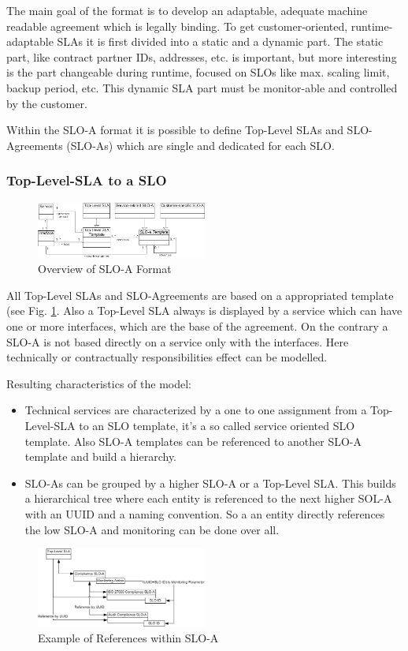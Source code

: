 The main goal of the format is to develop an adaptable, adequate machine readable agreement which is legally binding. To get customer-oriented, runtime-adaptable SLAs it is first divided into a static and a dynamic part. The static part, like contract partner IDs, addresses, etc. is important, but more interesting is the part changeable during runtime, focused on SLOs like max. scaling limit, backup period, etc. This dynamic SLA part must be monitor-able and controlled by the customer.

Within the SLO-A format it is possible to define Top-Level SLAs and SLO-Agreements (SLO-As) which are single and dedicated for each SLO.

\subsubsection{Top-Level-SLA to a SLO}
\begin{figure}[ht]
\includegraphics[width=0.5\textwidth]{fig/sloa_arch_allg.png}
\caption{Overview of SLO-A Format}
\label{fig:overview_sloa}
\end{figure}
All Top-Level SLAs and SLO-Agreements are based on a appropriated template (see Fig. \ref{fig:overview_sloa}. Also a Top-Level SLA always is displayed by a service which can have one or more interfaces, which are the base of the agreement. On the contrary a SLO-A is not based directly on a service only with the interfaces. Here technically or contractually responsibilities effect can be modelled.

Resulting characteristics of the model:
\begin{itemize}
\item Technical services are characterized by a one to one assignment from a Top-Level-SLA to an SLO template, it's a so called service oriented SLO template. Also SLO-A templates can be referenced to another SLO-A template and build a hierarchy.
\item SLO-As can be grouped by a higher SLO-A or a Top-Level SLA. This builds a hierarchical tree where each entity is referenced to the next higher SOL-A with an UUID and a naming convention. So a an entity directly references the low SLO-A and monitoring can be done over all. 
\end{itemize}
\begin{figure}[ht]
\includegraphics[width=0.5\textwidth]{fig/sloa_arch_refs.png}
\caption{Example of References within SLO-A}
\label{fig:example_sloa}
\end{figure}

